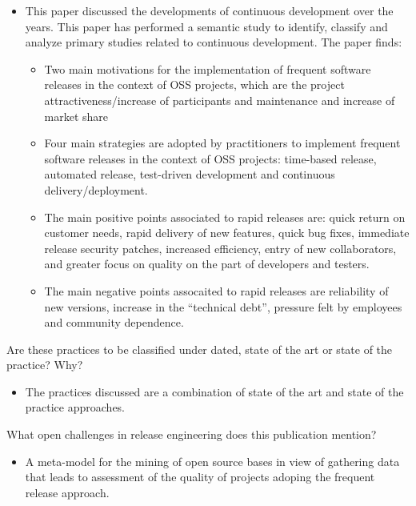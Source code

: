 \documentclass[]{book}
\providecommand{\tightlist}{%
  \setlength{\itemsep}{0pt}\setlength{\parskip}{0pt}}
\begin{document}
\begin{itemize}
\tightlist
\item
  This paper discussed the developments of continuous development over
  the years. This paper has performed a semantic study to identify,
  classify and analyze primary studies related to continuous
  development. The paper finds:

  \begin{itemize}
  \tightlist
  \item
    Two main motivations for the implementation of frequent software
    releases in the context of OSS projects, which are the project
    attractiveness/increase of participants and maintenance and increase
    of market share
  \item
    Four main strategies are adopted by practitioners to implement
    frequent software releases in the context of OSS projects:
    time-based release, automated release, test-driven development and
    continuous delivery/deployment.
  \item
    The main positive points associated to rapid releases are: quick
    return on customer needs, rapid delivery of new features, quick bug
    fixes, immediate release security patches, increased efficiency,
    entry of new collaborators, and greater focus on quality on the part
    of developers and testers.
  \item
    The main negative points assocaited to rapid releases are
    reliability of new versions, increase in the ``technical debt'',
    pressure felt by employees and community dependence.
  \end{itemize}
\end{itemize}

Are these practices to be classified under dated, state of the art or
state of the practice? Why?

\begin{itemize}
\tightlist
\item
  The practices discussed are a combination of state of the art and
  state of the practice approaches.
\end{itemize}

What open challenges in release engineering does this publication
mention?

\begin{itemize}
\tightlist
\item
  A meta-model for the mining of open source bases in view of gathering
  data that leads to assessment of the quality of projects adoping the
  frequent release approach.
\end{itemize}
\end{document}
